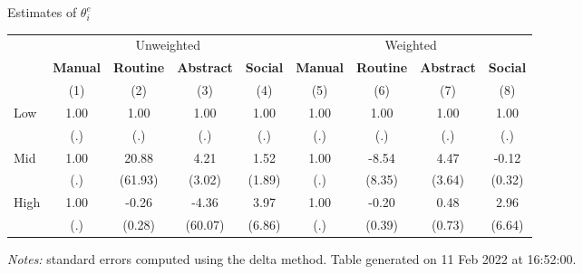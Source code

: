 \begin{center}
\begin{threeparttable}[!h]
\caption{Estimates of $\theta_{i}^e$}
\begin{tabular}{lcccccccc}
\toprule
\toprule
&\multicolumn{4}{c}{Unweighted}&\multicolumn{4}{c}{Weighted} \\
&\multicolumn{1}{c}{\textbf{Manual}}&\multicolumn{1}{c}{\textbf{Routine}}&\multicolumn{1}{c}{\textbf{Abstract}}&\multicolumn{1}{c}{\textbf{Social}}&\multicolumn{1}{c}{\textbf{Manual}}&\multicolumn{1}{c}{\textbf{Routine}}&\multicolumn{1}{c}{\textbf{Abstract}}&\multicolumn{1}{c}{\textbf{Social}} \\
\textbf{}&\multicolumn{1}{c}{(1)}&\multicolumn{1}{c}{(2)}&\multicolumn{1}{c}{(3)}&\multicolumn{1}{c}{(4)}&\multicolumn{1}{c}{(5)}&\multicolumn{1}{c}{(6)}&\multicolumn{1}{c}{(7)}&\multicolumn{1}{c}{(8)} \\
\midrule
Low                 &        1.00         &        1.00         &        1.00         &        1.00         &        1.00         &        1.00         &        1.00         &        1.00         \\
                    &         (.)         &         (.)         &         (.)         &         (.)         &         (.)         &         (.)         &         (.)         &         (.)         \\
Mid                 &        1.00         &       20.88         &        4.21         &        1.52         &        1.00         &       -8.54         &        4.47         &       -0.12         \\
                    &         (.)         &     (61.93)         &      (3.02)         &      (1.89)         &         (.)         &      (8.35)         &      (3.64)         &      (0.32)         \\
High                &        1.00         &       -0.26         &       -4.36         &        3.97         &        1.00         &       -0.20         &        0.48         &        2.96         \\
                    &         (.)         &      (0.28)         &     (60.07)         &      (6.86)         &         (.)         &      (0.39)         &      (0.73)         &      (6.64)         \\
\bottomrule
\bottomrule
\end{tabular}
\begin{tablenotes}
\item \footnotesize \textit{Notes:} standard errors computed using the delta method. Table generated on 11 Feb 2022 at 16:52:00.
\end{tablenotes}
\end{threeparttable}
\end{center}

